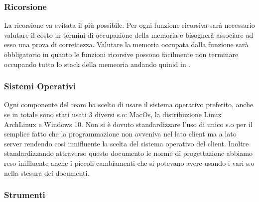 \subsubsection{Ricorsione}
La ricorsione va evitata il più possibile. Per ogni funzione ricorsiva sarà necessario valutare il costo in termini di occupazione della memoria e bisognerà associare ad esso una prova di correttezza.
Valutare la memoria occupata dalla funzione sarà obbligatorio in quanto le funzioni ricorsive possono facilmente non terminare occupando tutto lo stack della memeoria andando quinid in .

\subsubsection{Sistemi Operativi}
Ogni componente del team ha scelto di usare il sistema operativo preferito, anche se in totale sono stati usati 3 diversi s.o: MacOs, la distribuzione Linux ArchLinux e Windows 10. Non si è dovuto standardizzare l'uso di unico s.o per il semplice fatto che la programmazione non avveniva nel lato client ma a lato server rendendo cosi innifluente la scelta del sistema operativo del client. Inoltre standardizzando attraverso questo documento le norme di progettazione abbiamo reso iniffluente anche i piccoli cambiamenti che si potevano avere usando i vari s.o nella stesura dei documenti.



\subsubsection{Strumenti}
